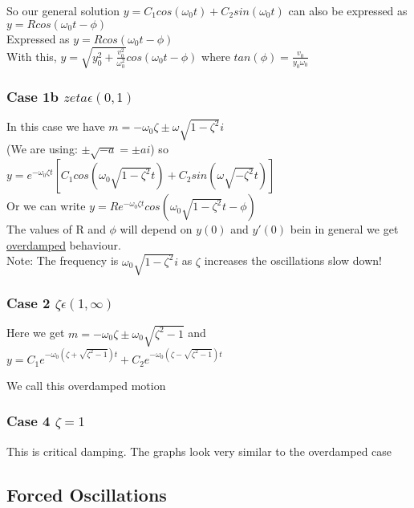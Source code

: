 \documentclass[12pt]{article}
\begin{document}
	So our general solution $y = C_1cos(\omega_0 t) + C_2sin(\omega_0 t)$ can also be expressed as $y = Rcos(\omega_0 t - \phi)$\\
	
	Expressed as $y = Rcos(\omega_0 t - \phi)$\\
	With this, $y= \sqrt{y_0^2 + \frac{v_0^2}{\omega_0^2}}cos(\omega_0 t - \phi)$ where $tan(\phi) = \frac{v_0}{y_0\omega_0}$
	
	\subsubsection*{Case 1b $zeta \epsilon (0,1)$}
	In this case we have $m = -\omega_0 \zeta \pm \omega \sqrt{1 - \zeta^2}i$\\
	(We are using: $\pm\sqrt{-a} = \pm ai$)
	so $y = e^{-\omega_0\zeta t}[C_1 cos(\omega_0 \sqrt{1-\zeta^2}t) + C_2sin(\omega\sqrt{-\zeta^2}t)]$\\
	
	Or we can write $y = Re^{-\omega_0 \zeta t}cos(\omega_0 \sqrt{1 - \zeta^2}t - \phi)$\\
	
	The values of R and $\phi$ will depend on $y(0)$ and $y'(0)$ bein in general we get \underline{overdamped} behaviour.\\
	
	Note: The frequency is $\omega_0\sqrt{1 - \zeta^2}i$ as $\zeta$ increases the oscillations slow down!\\
	
	\subsubsection*{Case 2 $\zeta \epsilon (1, \infty)$}
	Here we get $m = -\omega_0\zeta \pm \omega_0 \sqrt{\zeta^2 - 1}$ and $y = C_1 e^{-\omega_0(\zeta + \sqrt{\zeta^2 - 1})t} + C_2e^{-\omega_0(\zeta-\sqrt{\zeta^2 - 1})t}$
	
	We call this overdamped motion\\
	
	\subsubsection*{Case 4 $\zeta = 1$}
	This is critical damping. The graphs look very similar to the overdamped case\\
	
	\subsection*{Forced Oscillations}
	
\end{document}
